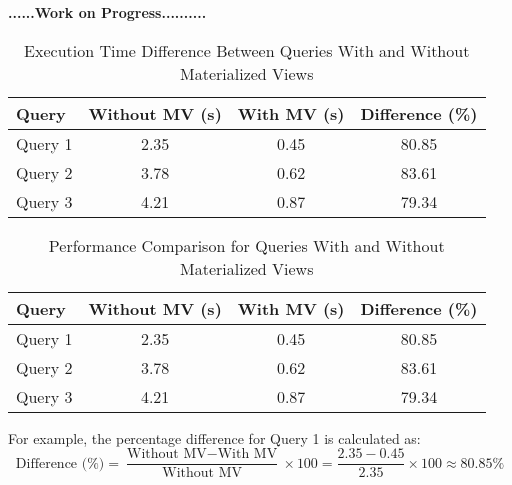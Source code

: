 \textbf{......\textbf{Work on Progress}..........}     
 


\begin{table}[h!]
    \centering
    \begin{tabular}{@{}lccc@{}}
        \toprule
        \textbf{Query} & \textbf{Without MV (s)} & \textbf{With MV (s)} & \textbf{Difference (\%)} \\ \midrule
        Query 1        & 2.35                   & 0.45                 & 80.85                   \\
        Query 2        & 3.78                   & 0.62                 & 83.61                   \\
        Query 3        & 4.21                   & 0.87                 & 79.34                   \\ \bottomrule
    \end{tabular}
    \caption{Execution Time Difference Between Queries With and Without Materialized Views}
    \label{tab:performance}
\end{table}


\begin{table}[h!]
    \centering
    \begin{tabular}{@{}lccc@{}}
        \toprule
        \textbf{Query} & \textbf{Without MV (s)} & \textbf{With MV (s)} & \textbf{Difference (\%)} \\ \midrule
        Query 1        & 2.35                   & 0.45                 & 80.85                   \\
        Query 2        & 3.78                   & 0.62                 & 83.61                   \\
        Query 3        & 4.21                   & 0.87                 & 79.34                   \\ \bottomrule
    \end{tabular}
    \caption{Performance Comparison for Queries With and Without Materialized Views}
    \label{tab:performance}
\end{table}

For example, the percentage difference for Query 1 is calculated as:
\[
\text{Difference (\%)} = \frac{\text{Without MV} - \text{With MV}}{\text{Without MV}} \times 100 = \frac{2.35 - 0.45}{2.35} \times 100 \approx 80.85\%
\]